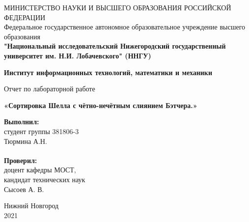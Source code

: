 \documentclass{report}
\begin{document}
\begin{titlepage}

\begin{center}
МИНИСТЕРСТВО НАУКИ И ВЫСШЕГО ОБРАЗОВАНИЯ РОССИЙСКОЙ ФЕДЕРАЦИИ\\
Федеральное государственное автономное образовательное учреждение высшего образования \\
\textbf{"Национальный исследовательский Нижегородский государственный университет им. Н.И. Лобачевского" (ННГУ)}
\end{center}

\begin{center}
\textbf{Институт информационных технологий, математики и механики}
\end{center}

\vspace{4em}

\begin{center}
Отчет по лабораторной работе \\
\end{center}
\begin{center}
\textbf{\Large«Сортировка Шелла с чётно-нечётным слиянием Бэтчера.»} \\
\end{center}

\vspace{4em}

\newbox{\lbox}
\newlength{\maxl}
\setlength{\maxl}{\wd\lbox}
\hfill\parbox{7cm}{
\hspace*{5cm}\hspace*{-5cm}\textbf{Выполнил:} \\ студент группы 381806-3 \\ Тюрмина А.Н.\\
\\
\hspace*{5cm}\hspace*{-5cm}\textbf{Проверил:}\\ доцент кафедры МОСТ, \\ кандидат технических наук \\ Сысоев А. В.\\
}
\vspace{\fill}

\begin{center} Нижний Новгород \\ 2021 \end{center}

\end{titlepage}
\end{document}
